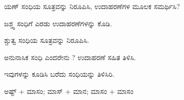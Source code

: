 \vspace{2.5pt plus 3pt minus 0.5pt}\noindent\hspace*{1.2em}\kbvnum{{[}6{]}}\hspace{0.55em}ಯಣ್ ಸಂಧಿಯ ಸೂತ್ರವನ್ನು ನಿರೂಪಿಸಿ, ಉದಾಹರಣೆಗಳ ಮೂಲಕ ಸಮರ್ಥಿಸಿ?\par

\vspace{2.5pt plus 3pt minus 0.5pt}\noindent\hspace*{1.2em}\kbvnum{{[}7{]}}\hspace{0.55em}ಜಶ್ತ್ವ ಸಂಧಿಗೆ ಎರಡು ಉದಾಹರಣೆಗಳನ್ನು ಕೊಡಿ.\par

\vspace{2.5pt plus 3pt minus 0.5pt}\noindent\hspace*{1.2em}\kbvnum{{[}8{]}}\hspace{0.55em}ಶ್ಚುತ್ವ ಸಂಧಿಯ ಸೂತ್ರವನ್ನು ನಿರೂಪಿಸಿ.\par

\vspace{2.5pt plus 3pt minus 0.5pt}\noindent\hspace*{1.2em}\kbvnum{{[}9{]}}\hspace{0.55em}ಅನುನಾಸಿಕ ಸಂಧಿ ಎಂದರೇನು ? ಉದಾಹರಣೆ ಸಹಿತ ತಿಳಿಸಿ.\par

\vspace{2.5pt plus 3pt minus 0.5pt}\noindent\hspace*{1.2em}\kbvnum{{[}10{]}}\hspace{0.55em}ಇವುಗಳನ್ನು ಕೂಡಿಸಿ ಬರೆದು ಸಂಧಿಯನ್ನು ತಿಳಿಸಿರಿ.\par

\indent ಅಷ್ಟ್ + ಮಾಸಂ; ಮಾಸ್ + ಮಾನ; ಮಾಸಂ + ಮಾಸಂ\par
